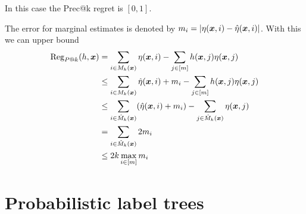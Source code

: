 \documentclass{article}
\begin{document}
In this case the Prec@k regret is $[0,1]$.

The error for marginal estimates is denoted by $m_i = \vert \eta (\boldsymbol{x} ,i ) - \hat{\eta} (\boldsymbol{x} ,i )\vert$. With this we can upper bound 
\begin{align}
\mbox{Reg}_{P@k} (h, \boldsymbol{x}) 
  & = \sum_{i \in M_k(\boldsymbol{x})} \eta (\boldsymbol{x} ,i ) - \sum_{j \in [m]} h(\boldsymbol{x}, j) \eta(\boldsymbol{x} , j ) \notag \\
  & \le \sum_{i \in M_k(\boldsymbol{x})} \hat{\eta} (\boldsymbol{x} ,i ) + m_i - \sum_{j \in [m]} h(\boldsymbol{x}, j) \eta(\boldsymbol{x} , j ) \notag \\ 
  & \le \sum_{i \in \hat{M}_k(\boldsymbol{x})} (\hat{\eta} (\boldsymbol{x} ,i ) + m_i )- \sum_{j \in \hat{M}_k(\boldsymbol{x})}  \eta(\boldsymbol{x} , j ) \notag \\
  & = \sum_{i \in \hat{M}_k(\boldsymbol{x})} 2m_i \notag \\
  & \le 2k\max_{i \in [m]} m_i
\end{align}

\section{Probabilistic label trees}
\label{app:plt}
\end{document}
